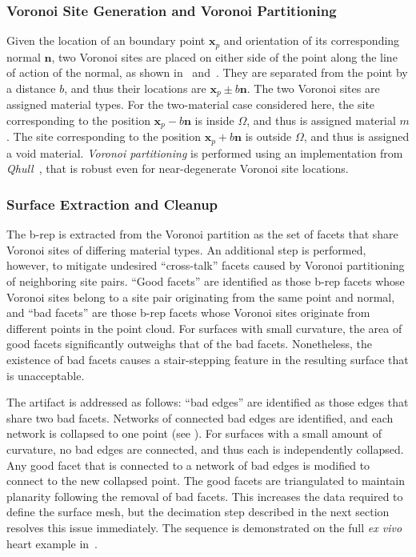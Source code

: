 \subsubsection{Voronoi Site Generation and Voronoi Partitioning}

Given the location of an boundary point $\bm{x}_p$ and orientation of its corresponding normal $\bm{n}$, two Voronoi sites are placed on either side of the point along the line of action of the normal, as shown in~ and~. They are separated from the point by a distance $b$, and thus their locations are $\bm{x}_p \pm b \bm{n}$. The two Voronoi sites are assigned material types. For the two-material case considered here, the site corresponding to the position $\bm{x}_p - b\bm{n}$ is inside $\Omega$, and thus is assigned material $m$. The site corresponding to the position $\bm{x}_p + b\bm{n}$ is outside $\Omega$, and thus is assigned a void material. \textit{Voronoi partitioning} is performed using an implementation from \textit{Qhull}~\cite{barber_1996}, that is robust even for near-degenerate Voronoi site locations.

\subsubsection{Surface Extraction and Cleanup}

The b-rep is extracted from the Voronoi partition as the set of facets that share Voronoi sites of differing material types. An additional step is performed, however, to mitigate undesired ``cross-talk'' facets caused by Voronoi partitioning of neighboring site pairs. ``Good facets'' are identified as those b-rep facets whose Voronoi sites belong to a site pair originating from the same point and normal, and ``bad facets'' are those b-rep facets whose Voronoi sites originate from different points in the point cloud. For surfaces with small curvature, the area of good facets significantly outweighs that of the bad facets. Nonetheless, the existence of bad facets causes a stair-stepping feature in the resulting surface that is unacceptable.

The artifact is addressed as follows: ``bad edges'' are identified as those edges that share two bad facets. Networks of connected bad edges are identified, and each network is collapsed to one point (see ). For surfaces with a small amount of curvature, no bad edges are connected, and thus each is independently collapsed. Any good facet that is connected to a network of bad edges is modified to connect to the new collapsed point. The good facets are triangulated to maintain planarity following the removal of bad facets. This increases the data required to define the surface mesh, but the decimation step described in the next section resolves this issue immediately. The sequence is demonstrated on the full \textit{ex vivo} heart example in~.

